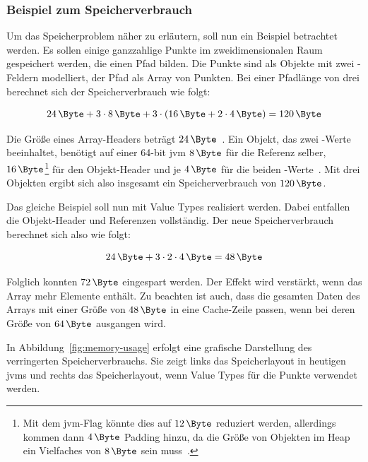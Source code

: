 \subsubsection{Beispiel zum Speicherverbrauch}\label{subsubsec:memory-example}

Um das Speicherproblem näher zu erläutern, soll nun ein Beispiel betrachtet werden.
Es sollen einige ganzzahlige Punkte im zweidimensionalen Raum gespeichert werden, die einen Pfad bilden.
Die Punkte sind als Objekte mit zwei -Feldern modelliert, der Pfad als Array von Punkten.
Bei einer Pfadlänge von drei berechnet sich der Speicherverbrauch wie folgt:

\begin{equation}
    \SI{24}{\Byte} + 3 \cdot \SI{8}{\Byte} + 3 \cdot (\SI{16}{\Byte} + 2 \cdot \SI{4}{\Byte}) = \SI{120}{\Byte}\label{eq:memory-usage-current}
\end{equation}

Die Größe eines Array-Headers beträgt $\SI{24}{\Byte}$~\cite{compressed-oops}.
Ein Objekt, das zwei -Werte beeinhaltet, benötigt auf einer 64-bit \ac{jvm} $\SI{8}{\Byte}$ für die Referenz selber, $\SI{16}{\Byte}$\footnote{Mit dem \ac{jvm}-Flag  könnte dies auf $\SI{12}{\Byte}$ reduziert werden, allerdings kommen dann $\SI{4}{\Byte}$ Padding hinzu, da die Größe von Objekten im Heap ein Vielfaches von $\SI{8}{\Byte}$ sein muss~\cite{compressed-oops}.} für den Objekt-Header und je $\SI{4}{\Byte}$ für die beiden -Werte~\cite{compressed-oops}.
Mit drei Objekten ergibt sich also insgesamt ein Speicherverbrauch von $\SI{120}{\Byte}$.

Das gleiche Beispiel soll nun mit Value Types realisiert werden.
Dabei entfallen die Objekt-Header und Referenzen vollständig.
Der neue Speicherverbrauch berechnet sich also wie folgt:

\begin{equation}
    \SI{24}{\Byte} + 3 \cdot 2 \cdot \SI{4}{\Byte} = \SI{48}{\Byte}\label{eq:memory-usage-inline}
\end{equation}

Folglich konnten $\SI{72}{\Byte}$ eingespart werden.
Der Effekt wird verstärkt, wenn das Array mehr Elemente enthält.
Zu beachten ist auch, dass die gesamten Daten des Arrays mit einer Größe von $\SI{48}{\Byte}$ in eine Cache-Zeile passen, wenn bei deren Größe von $\SI{64}{\Byte}$ ausgangen wird.

In Abbildung~\ref{fig:memory-usage} erfolgt eine grafische Darstellung des verringerten Speicherverbrauchs.
Sie zeigt links das Speicherlayout in heutigen \acp{jvm} und rechts das Speicherlayout, wenn Value Types für die Punkte verwendet werden.


